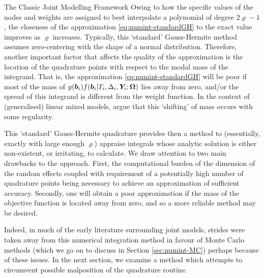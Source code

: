 \begin{chapter}{\label{cha:methods-classic}The Classic Joint Modelling Framework}
Owing to how the specific values of the nodes and weights are assigned to best interpolate a polynomial of degree $2\varrho-1$, the closeness of the approximation \eqref{eq:numint-standardGH} to the exact value improves as $\varrho$ increases. Typically, this `standard' Gauss-Hermite method assumes zero-centering with the shape of a normal distribution. Therefore, another important factor that affects the quality of the approximation is the location of the quadrature points with respect to the modal mass of the integrand. That is, the approximation \eqref{eq:numint-standardGH} will be poor if most of the mass of $g\!\left(\bm{b}_i\right)\!f\!\left(\bm{b}_i|T_i,\Delta_i,\bm{Y}_i;\bm{\mathrm{\Omega}}\right)$ lies away from zero, and/or the spread of this integrand is different from the weight function. In the context of (generalised) linear mixed models, \citet{Stringer2022} argue that this `shifting' of mass occurs with some regularity.

This `standard' Gauss-Hermite quadrature provides then a method to (essentially, exactly with large enough $\varrho$) appraise integrals whose analytic solution is either non-existent, or irritating, to calculate. We draw attention to two main drawbacks to the approach. First, the computational burden of the dimension of the random effects coupled with requirement of a potentially high number of quadrature points being necessary to achieve an approximation of sufficient accuracy. Secondly, one will obtain a poor approximation if the mass of the objective function is located away from zero, and so a more reliable method may be desired. 

Indeed, in much of the early literature surrounding joint models, strides were taken away from this numerical integration method in favour of Monte Carlo methods (which we go on to discuss in Section \ref{sec:numint-MC}) perhaps because of these issues. In the next section, we examine a method which attempts to circumvent possible malposition of the quadrature routine. 


\end{chapter}
